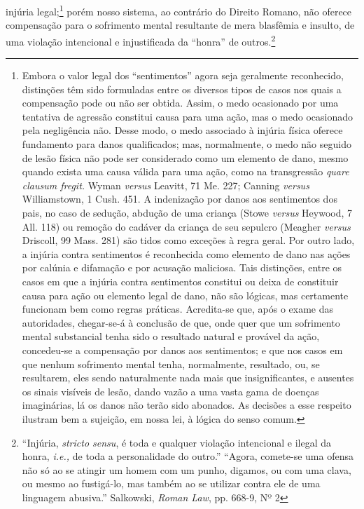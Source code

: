 injúria legal;\footnote{Embora o valor legal dos ``sentimentos'' agora
  seja geralmente reconhecido, distinções têm sido formuladas entre os
  diversos tipos de casos nos quais a compensação pode ou não ser
  obtida. Assim, o medo ocasionado por uma tentativa de agressão
  constitui causa para uma ação, mas o medo ocasionado pela negligência
  não. Desse modo, o medo associado à injúria física oferece fundamento
  para danos qualificados; mas, normalmente, o medo não seguido de lesão
  física não pode ser considerado como um elemento de dano, mesmo quando
  exista uma causa válida para uma ação, como na transgressão
  \emph{quare clausum fregit.} Wyman \emph{versus} Leavitt, 71 Me. 227;
  Canning \emph{versus} Williamstown, 1 Cush. 451. A indenização por
  danos aos sentimentos dos pais, no caso de sedução, abdução de uma
  criança (Stowe \emph{versus} Heywood, 7 All. 118) ou remoção do
  cadáver da criança de seu sepulcro (Meagher \emph{versus} Driscoll, 99
  Mass. 281) são tidos como exceções à regra geral. Por outro lado, a
  injúria contra sentimentos é reconhecida como elemento de dano nas
  ações por calúnia e difamação e por acusação maliciosa. Tais
  distinções, entre os casos em que a injúria contra sentimentos
  constitui ou deixa de constituir causa para ação ou elemento legal de
  dano, não são lógicas, mas certamente funcionam bem como regras
  práticas. Acredita-se que, após o exame das autoridades, chegar-se-á à
  conclusão de que, onde quer que um sofrimento mental substancial tenha
  sido o resultado natural e provável da ação, concedeu-se a compensação
  por danos aos sentimentos; e que nos casos em que nenhum sofrimento
  mental tenha, normalmente, resultado, ou, se resultarem, eles sendo
  naturalmente nada mais que insignificantes, e ausentes os sinais
  visíveis de lesão, dando vazão a uma vasta gama de doenças
  imaginárias, lá os danos não terão sido abonados. As decisões a esse
  respeito ilustram bem a sujeição, em nossa lei, à lógica do senso
  comum.} porém nosso sistema, ao contrário do Direito Romano, não
oferece compensação para o sofrimento mental resultante de mera
blasfêmia e insulto, de uma violação intencional e injustificada da
``honra'' de outros.\footnote{``Injúria, \emph{stricto sensu}, é toda e
  qualquer violação intencional e ilegal da honra, \emph{i.e.,} de toda
  a personalidade do outro.'' ``Agora, comete-se uma ofensa não só ao se
  atingir um homem com um punho, digamos, ou com uma clava, ou mesmo ao
  fustigá-lo, mas também ao se utilizar contra ele de uma linguagem
  abusiva.'' Salkowski, \emph{Roman Law}, pp. 668-9, Nº 2}

